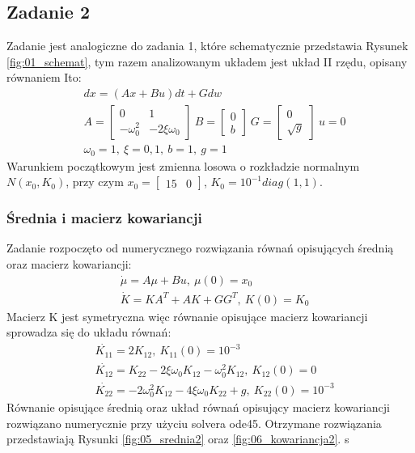 \documentclass[a4paper,15pt]{article}
\begin{document}
\subsection{Zadanie 2 }
Zadanie jest analogiczne do zadania 1, które schematycznie przedstawia Rysunek \ref{fig:01_schemat}, tym razem analizowanym układem jest układ II rzędu, opisany równaniem Ito:
\begin{align*}
& dx = ( Ax + Bu ) dt + Gdw \\
& A = 
\begin{bmatrix}
0 & 1  \\
- \omega _0^2 & -2\xi \omega _0 
\end{bmatrix} \
B = 
\begin{bmatrix}
0 \\
b
\end{bmatrix} \
G = 
\begin{bmatrix}
0 \\
\sqrt{g}
\end{bmatrix} \
u = 0 \\
& \omega _0 = 1, \ \xi = 0,1, \ b=1, \ g=1
\end{align*}
Warunkiem początkowym jest zmienna losowa o rozkładzie normalnym \( N(x_0, K_0) \), przy czym \mbox{\( x_0 = \begin{bmatrix} 15 & 0 \end{bmatrix} \)}, \( K_0 = 10^{-1}diag(1,1)\).

\subsubsection{Średnia i macierz kowariancji}
Zadanie rozpoczęto od numerycznego rozwiązania równań opisujących średnią oraz macierz kowariancji:
\begin{align*}
& \dot{\mu} = A\mu + Bu, \ \mu(0)=x_0 \\
& \dot{K} = KA^T + AK +GG^T, \ K(0)=K_0
\end{align*}
Macierz K jest symetryczna więc równanie opisujące macierz kowariancji sprowadza się do układu równań:
\begin{align*}
& \dot{K_{11}} = 2K_{12}, \ K_{11}(0)=10^{-3} \\
& \dot{K_{12}} = K_{22} - 2\xi\omega _0 K_{12} - \omega _{0}^{2}K_{12}, \ K_{12}(0)=0 \\
& \dot{K_{22}} = -2\omega _0^2 K_{12} - 4\xi \omega_0 K_{22} +g , \ K_{22}(0)=10^{-3}
\end{align*}
Równanie opisujące średnią oraz układ równań opisujący macierz kowariancji rozwiązano numerycznie przy użyciu solvera ode45. Otrzymane rozwiązania przedstawiają Rysunki \ref{fig:05_srednia2} oraz \ref{fig:06_kowariancja2}.
s
\end{document}
